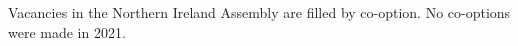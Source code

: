 \documentclass[a4paper,openany]{book}
\begin{document}
Vacancies in the Northern Ireland Assembly are filled by co-option.
No co-options were made in 2021.
%

%
%
\end{document}

